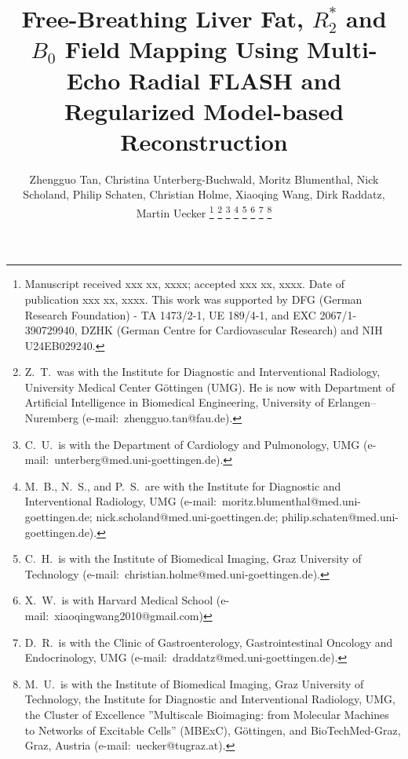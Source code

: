 \documentclass[journal,twoside,web]{ieeecolor}
\begin{document}
\title{Free-Breathing Liver Fat, $R_2^*$ and $B_0$ Field Mapping Using Multi-Echo Radial FLASH and Regularized Model-based Reconstruction}
\author{Zhengguo Tan, Christina Unterberg-Buchwald, Moritz Blumenthal, Nick Scholand, Philip Schaten, Christian Holme, Xiaoqing Wang, Dirk Raddatz, Martin Uecker
%
\thanks{Manuscript received xxx xx, xxxx; accepted xxx xx, xxxx. Date of publication xxx xx, xxxx.
	This work was supported by DFG (German Research Foundation) 
	- TA 1473/2-1, UE 189/4-1, and EXC 2067/1-390729940, 
	DZHK (German Centre for Cardiovascular Research) and NIH U24EB029240.}
\thanks{Z.~T.~was with the Institute for Diagnostic and Interventional Radiology, 
	University Medical Center G\"ottingen (UMG). 
	He is now with Department of Artificial Intelligence in 
	Biomedical Engineering, University of Erlangen–Nuremberg 
	(e-mail:~zhengguo.tan@fau.de).}
\thanks{C.~U.~is with the Department of Cardiology and Pulmonology, UMG 
	(e-mail:~unterberg@med.uni-goettingen.de).}
\thanks{M.~B., N.~S., and P.~S.~are with the
	Institute for Diagnostic and Interventional Radiology, UMG 
	(e-mail:~moritz.blumenthal@med.uni-goettingen.de; 
	nick.scholand@med.uni-goettingen.de; 
	philip.schaten@med.uni-goettingen.de).}
\thanks{C.~H.~is with the Institute of Biomedical Imaging, 
	Graz University of Technology 
	(e-mail:~christian.holme@med.uni-goettingen.de).}
\thanks{X.~W.~is with Harvard Medical School 
	(e-mail:~xiaoqingwang2010@gmail.com)}
\thanks{D.~R.~is with the Clinic of Gastroenterology, 
	Gastrointestinal Oncology and Endocrinology, UMG 
	(e-mail:~draddatz@med.uni-goettingen.de).}
\thanks{M.~U.~is with the Institute of Biomedical Imaging, 
	Graz University of Technology, the
	Institute for Diagnostic and Interventional Radiology, UMG,
	the Cluster of Excellence ''Multiscale Bioimaging: from Molecular
	Machines to Networks of Excitable Cells'' (MBExC), G\"ottingen,
	and BioTechMed-Graz, Graz, Austria
	(e-mail:~uecker@tugraz.at).}}

\maketitle
\end{document}
